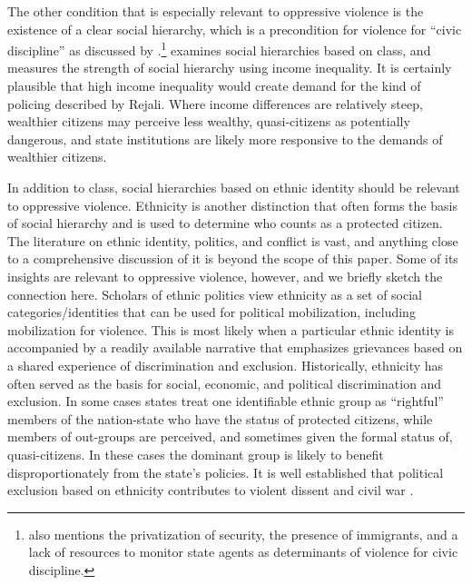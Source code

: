 \documentclass[11pt]{article}
\begin{document}
The other condition that is especially relevant to oppressive violence is the existence of a clear social hierarchy, which is a precondition for violence for ``civic discipline'' as discussed by \cite{Rejali2007}.\footnote{\cite{Rejali2007} also mentions the privatization of security, the presence of immigrants, and a lack of resources to monitor state agents as determinants of violence for civic discipline.} \citet{Haschke2018} examines social hierarchies based on class, and measures the strength of social hierarchy using income inequality. It is certainly plausible that high income inequality would create demand for the kind of policing described by Rejali. Where income differences are relatively steep,  wealthier citizens may perceive less wealthy, quasi-citizens as potentially dangerous, and state institutions are likely more responsive to the demands of wealthier citizens. 

In addition to class, social hierarchies based on ethnic identity should be relevant to oppressive violence. Ethnicity is another distinction that often forms the basis of social hierarchy and is used to determine who counts as a protected citizen. The literature on ethnic identity, politics, and conflict is vast, and anything close to a comprehensive discussion of it is beyond the scope of this paper. Some of its insights are relevant to oppressive violence, however, and we briefly sketch the connection here. Scholars of ethnic politics view ethnicity as a set of social categories/identities that can be used for political mobilization, including mobilization for violence. This is most likely when a particular ethnic identity is accompanied by a readily available narrative that emphasizes grievances based on a shared experience of discrimination and exclusion. Historically, ethnicity has often served as the basis for social, economic, and political discrimination and exclusion. In some cases states treat one identifiable ethnic group as ``rightful'' members of the nation-state who have the status of protected citizens, while members of out-groups are perceived, and sometimes given the formal status of, quasi-citizens. In these cases the dominant group is likely to benefit disproportionately from the state's policies. It is well established that political exclusion based on ethnicity contributes to violent dissent and civil war \citep{birnir2006ethnicity,cederman2013inequality}.
\end{document}
